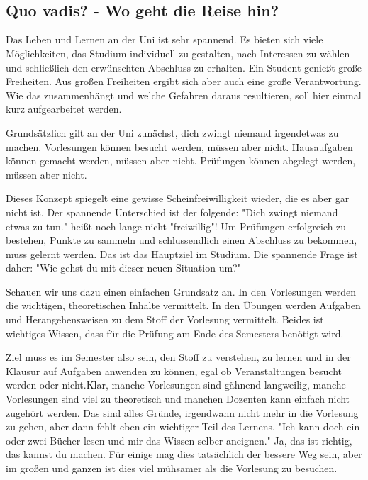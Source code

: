\\ \\
\subsection{Quo vadis? - Wo geht die Reise hin?}
	Das Leben und Lernen an der Uni ist sehr spannend. Es bieten sich viele Möglichkeiten, das Studium individuell zu gestalten, nach Interessen zu wählen und schließlich den erwünschten Abschluss zu erhalten. Ein Student genießt große Freiheiten. Aus großen Freiheiten ergibt sich aber auch eine große Verantwortung. Wie das zusammenhängt und welche Gefahren daraus resultieren, soll hier einmal kurz aufgearbeitet werden.
	
	Grundsätzlich gilt an der Uni zunächst, dich zwingt niemand irgendetwas zu machen. Vorlesungen können besucht werden, müssen aber nicht. Hausaufgaben können gemacht werden, müssen aber nicht. Prüfungen können abgelegt werden, müssen aber nicht.
	
	Dieses Konzept spiegelt eine gewisse Scheinfreiwilligkeit wieder, die es aber gar nicht ist. Der spannende Unterschied ist der folgende: "Dich zwingt niemand etwas zu tun." heißt noch lange nicht "freiwillig"! Um Prüfungen erfolgreich zu bestehen, Punkte zu sammeln und schlussendlich einen Abschluss zu bekommen, muss gelernt werden. Das ist das Hauptziel im Studium. Die spannende Frage ist daher: "Wie gehst du mit dieser neuen Situation um?"
	
	Schauen wir uns dazu einen einfachen Grundsatz an. In den Vorlesungen werden die wichtigen, theoretischen Inhalte vermittelt. In den Übungen werden Aufgaben und Herangehensweisen zu dem Stoff der Vorlesung vermittelt. Beides ist wichtiges Wissen, dass für die Prüfung am Ende des Semesters benötigt wird.
	
	Ziel muss es im Semester also sein, den Stoff zu verstehen, zu lernen und in der Klausur auf Aufgaben anwenden zu können, egal ob Veranstaltungen besucht werden oder nicht.Klar, manche Vorlesungen sind gähnend langweilig, manche Vorlesungen sind viel zu theoretisch und manchen Dozenten kann einfach nicht zugehört werden. Das sind alles Gründe, irgendwann nicht mehr in die Vorlesung zu gehen, aber dann fehlt eben ein wichtiger Teil des Lernens. "Ich kann doch ein oder zwei Bücher lesen und mir das Wissen selber aneignen." Ja, das ist richtig, das kannst du machen. Für einige mag dies tatsächlich der bessere Weg sein, aber im großen und ganzen ist dies viel mühsamer als die Vorlesung zu besuchen.
	
